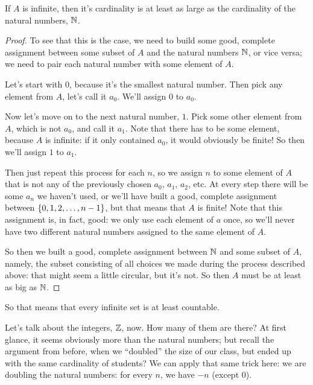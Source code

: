 \begin{theorem}
    If $A$ is infinite, then it's cardinality is at least as large as the cardinality of the natural numbers, $\mathbb{N}$.
\end{theorem}
\begin{proof}
    To see that this is the case, we need to build some good, complete assignment between some subset of $A$ and the natural numbers $\mathbb{N}$, or vice versa; we need to pair each natural number with some element of $A$.

    Let's start with $0$, because it's the smallest natural number.
    Then pick any element from $A$, let's call it $a_0$.
    We'll assign $0$ to $a_0$.

    Now let's move on to the next natural number, $1$.
    Pick some other element from $A$, which is not $a_0$, and call it $a_1$.
    Note that there has to be some element, because $A$ is infinite: if it only contained $a_0$, it would obviously be finite!
    So then we'll assign $1$ to $a_1$.

    Then just repeat this process for each $n$, so we assign $n$ to some element of $A$ that is not any of the previously chosen $a_0$, $a_1$, $a_2$, etc. 
    At every step there will be some $a_n$ we haven't used, or we'll have built a good, complete assignment between ${\left\{ {0, 1, 2, \ldots, n - 1} \right\}}$, but that means that $A$ is finite!
    Note that this assignment is, in fact, good: we only use each element of $a$ once, so we'll never have two different natural numbers assigned to the same element of $A$.

    So then we built a good, complete assignment between $\mathbb{N}$ and some subset of $A$, namely, the subset consisting of all choices we made during the process described above: that might seem a little circular, but it's not. 
    So then $A$ must be at least as big as $\mathbb{N}$.
\end{proof}

So that means that every infinite set is at least countable.

Let's talk about the integers, $\mathbb{Z}$, now.
How many of them are there?
At first glance, it seems obviously more than the natural numbers; but recall the argument from before, when we ``doubled'' the size of our class, but ended up with the same cardinality of students?
We can apply that same trick here: we are doubling the natural numbers: for every $n$, we have $-n$ (except $0$).

